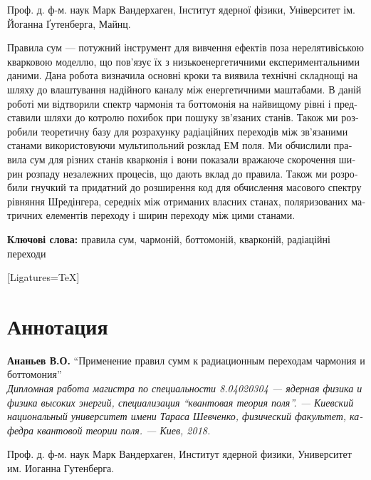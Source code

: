 \begin{titlepage}
\begin{otherlanguage}{ukrainian}
     Проф. д. ф-м. наук Марк Вандерхаген, Інститут ядерної фізики,
Університет ім. Йоганна Ґутенберга, Майнц.

    Правила сум --- потужний інструмент для вивчення ефектів поза нерелятивіською кварковою моделлю, що пов'язує їх з низькоенергетичними експериментальними даними. Дана робота визначила основні кроки та виявила технічні складнощі на шляху до влаштування надійного каналу між енергетичними маштабами. В даній роботі ми відтворили спектр чармонія та боттомонія на найвищому рівні і представили шляхи до котролю похибок при пошуку зв'язаних станів. Також ми розробили теоретичну базу для розрахунку радіаційних переходів між зв'язаними станами використовуючи мультипольний розклад ЕМ поля. Ми обчислили правила сум для різних станів кварконія і вони показали вражаюче скорочення ширин розпаду незалежних процесів, що дають вклад до правила. Також ми розробили гнучкий та придатний до розширення код для обчислення масового спектру рівняння Шредінгера, середніх між отриманих власних станах, поляризованих матричних елементів переходу і ширин переходу між цими станами.

    \noindent \textbf{Ключові слова:} правила сум, чармоній, боттомоній, кварконій, радіаційні переходи
    \end{otherlanguage}
    \vspace{-1cm}
    \begin{otherlanguage}{russian}
    [Ligatures=TeX]
    \section*{Аннотация}
    \textbf{Ананьев В.О.} ``Применение правил сумм к радиационным переходам чармония и боттомония'' \\
    {\itshape Дипломная работа магистра по специальности 8.04020304 --- ядерная физика и физика высоких энергий, специализация ``квантовая теория поля''. --- Киевский национальный университет имени Тараса Шевченко, физический факультет, кафедра квантовой теории поля. --- Киев, 2018.}

     Проф. д. ф-м. наук Марк Вандерхаген, Институт ядерной физики,
Университет им. Иоганна Гутенберга.


\end{otherlanguage}
\end{titlepage}
